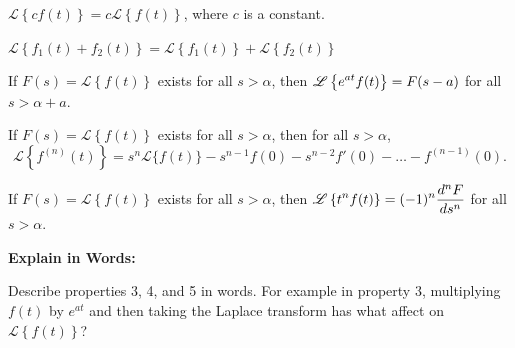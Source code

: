 \begin{enumerate}[label=L.\arabic*]
\ii $\mathscr{L} \left\{ cf(t) \right\} = c  \mathscr{L} \left\{ f(t) \right\}$, where $c$ is a constant. \ms

\ii $\mathscr{L} \left\{ f_1(t) + f_2(t) \right\} = \mathscr{L} \left\{ f_1(t) \right\} + \mathscr{L} \left\{ f_2(t)\right\}$ \ms

\ii If $F(s) = \mathscr{L} \left\{ f(t) \right\}$ exists for all $s > \alpha$, then $\displaystyle \mathscr{L} \left\{ e^{at} f(t) \right\} = F(s-a)$ for all $s>\alpha + a$.  \ms

\ii If $F(s) =\mathscr{L} \left\{ f(t) \right\}$ exists for all $s > \alpha$, then for all $s>\alpha$,
\[ \mathscr{L} \left\{ f^{(n)}(t) \right\} = s^n \mathscr{L} \{ f(t) \}-s^{n-1} f(0)- s^{n-2} f'(0) - \ldots - f^{(n-1)}(0).\] \ms


\ii If $F(s) =\mathscr{L} \left\{ f(t) \right\}$ exists for all $s > \alpha$, then $\displaystyle \mathscr{L} \left\{ t^n f(t) \right\} = (-1)^n \frac{d^nF}{ds^n}$ for all $s > \alpha$.
\ee


 \textbf{Explain in Words:}

\bb
\ii Describe properties 3, 4, and 5 in words. For example in property 3, multiplying $f(t)$ by $e^{at}$ and then taking the Laplace transform has what affect on $\mathscr{L} \left\{ f(t) \right\}$? \label{17problem1}
\ee


\end{enumerate}
